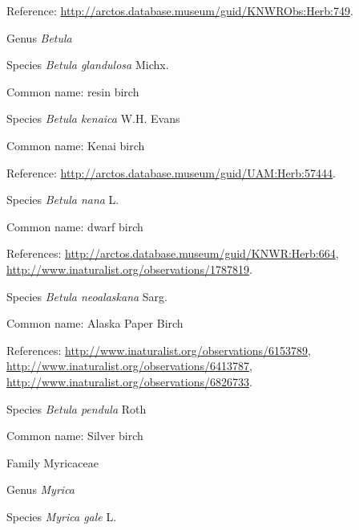 \documentclass[9pt, article]{memoir}
\begin{document}
\begin{multicols}{2}
Reference: 
\url{http://arctos.database.museum/guid/KNWRObs:Herb:749}.

\vspace{6pt}\noindent\hspace{30pt}Genus \textit{Betula}


\vspace{6pt}\noindent\hspace{36pt}Species \textit{Betula glandulosa} Michx.


Common name: resin birch

\vspace{6pt}\noindent\hspace{36pt}Species \textit{Betula kenaica} W.H. Evans


Common name: Kenai birch

Reference: 
\url{http://arctos.database.museum/guid/UAM:Herb:57444}.

\vspace{6pt}\noindent\hspace{36pt}Species \textit{Betula nana} L.


Common name: dwarf birch

References: 
\url{http://arctos.database.museum/guid/KNWR:Herb:664}, 
\url{http://www.inaturalist.org/observations/1787819}.

\vspace{6pt}\noindent\hspace{36pt}Species \textit{Betula neoalaskana} Sarg.


Common name: Alaska Paper Birch

References: 
\url{http://www.inaturalist.org/observations/6153789}, 
\url{http://www.inaturalist.org/observations/6413787}, 
\url{http://www.inaturalist.org/observations/6826733}.

\vspace{6pt}\noindent\hspace{36pt}Species \textit{Betula pendula} Roth


Common name: Silver birch

\vspace{6pt}\noindent\hspace{24pt}Family Myricaceae


\vspace{6pt}\noindent\hspace{30pt}Genus \textit{Myrica}


\vspace{6pt}\noindent\hspace{36pt}Species \textit{Myrica gale} L.



\end{multicols}
\end{document}
